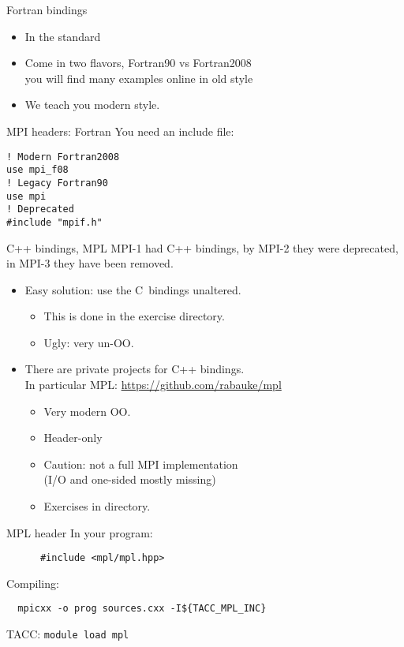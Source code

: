 \begin{fortran}
  \addtocounter{slidecount}{-2}
\begin{numberedframe}{Fortran bindings}
    \begin{itemize}
    \item
      In the standard
    \item Come in two flavors, Fortran90 vs Fortran2008\\
      you will find many examples online in old style
    \item We teach you modern style.
    \end{itemize}
\end{numberedframe}

\begin{numberedframe}{MPI headers: Fortran}
    \label{sl:mpi-header-f}
    You need an include file:
\begin{verbatim}
! Modern Fortran2008
use mpi_f08
! Legacy Fortran90
use mpi       
! Deprecated
#include "mpif.h"
\end{verbatim}
\end{numberedframe}
\end{fortran}

\begin{mpl}
  \addtocounter{slidecount}{-2}
\begin{numberedframe}{C++ bindings, MPL}
  MPI-1 had C++ bindings, by MPI-2 they were deprecated, in MPI-3 they have been removed.
  \begin{itemize}
  \item Easy solution: use the C~bindings unaltered.
    \begin{itemize}
    \item This is done in the  exercise directory.
    \item Ugly: very un-OO.
    \end{itemize}
  \item There are private projects for C++ bindings.\\
    In particular
    MPL: \url{https://github.com/rabauke/mpl}
    \begin{itemize}
    \item Very modern OO.
    \item Header-only
    \item Caution: not a full MPI implementation\\
      (I/O and one-sided mostly missing)
    \item Exercises in  directory.
    \end{itemize}
  \end{itemize}
\end{numberedframe}

\begin{numberedframe}{MPL header}
    In your program:
    \begin{lstlisting}
      #include <mpl/mpl.hpp>
    \end{lstlisting}
    Compiling:
\begin{verbatim}
  mpicxx -o prog sources.cxx -I${TACC_MPL_INC}
\end{verbatim}
TACC: \texttt{module load mpl}
\end{numberedframe}
\end{mpl}

